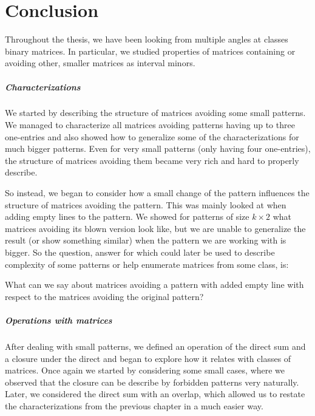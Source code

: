 \chapter*{Conclusion}
Throughout the thesis, we have been looking from multiple angles at classes binary matrices. In particular, we studied properties of matrices containing or avoiding other, smaller matrices as interval minors.

\paragraph{Characterizations}
We started by describing the structure of matrices avoiding some small patterns. We managed to characterize all matrices avoiding patterns having up to three one-entries and also showed how to generalize some of the characterizations for much bigger patterns. Even for very small patterns (only having four one-entries), the structure of matrices avoiding them became very rich and hard to properly describe.

So instead, we began to consider how a small change of the pattern influences the structure of matrices avoiding the pattern. This was mainly looked at when adding empty lines to the pattern. We showed for patterns of size $k\times2$ what matrices avoiding its blown version look like, but we are unable to generalize the result (or show something similar) when the pattern we are working with is bigger. So the question, answer for which could later be used to describe complexity of some patterns or help enumerate matrices from some class, is:
\begin{ques}
What can we say about matrices avoiding a pattern with added empty line with respect to the matrices avoiding the original pattern?
\end{ques}

\paragraph{Operations with matrices}
After dealing with small patterns, we defined an operation of the direct sum and a closure under the direct and began to explore how it relates with classes of matrices. Once again we started by considering some small cases, where we observed that the closure can be describe by forbidden patterns very naturally. Later, we considered the direct sum with an overlap, which allowed us to restate the characterizations from the previous chapter in a much easier way.

